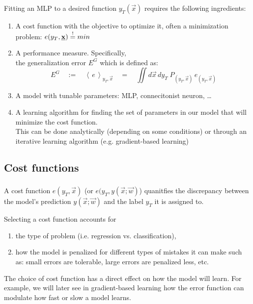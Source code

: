 \begin{frame}\frametitle{\subsecname}


Fitting an MLP to a desired function $y_T(\vec x)$ requires the following ingredients:

\begin{enumerate}
\item A cost function with the objective to optimize it, often a minimization problem: $e(y_T, \underline{\mathbf{x}}) \stackrel{\mathrm{!}}{=} min$
\item A performance measure. Specifically, \\

the generalization error $E^G$ which is defined as:	
\begin{equation} 
			E^G \quad := \quad \left<\,e\,\right>_{y_T, \vec{x}} 
			\quad = \quad \iint d \vec{x} \, dy_T \; 
				P_{(y_T, \vec{x})} \, e_{(y_T, \vec{x})}
\end{equation}

\item A model with tunable parameters: MLP, connecitonist neuron, \ldots
\item A learning algorithm for finding the set of parameters in our model that will minimize the cost function.\\
This can be done analytically (depending on some conditions) or through an iterative learning algorithm (e.g. gradient-based learning)
\end{enumerate}

\end{frame}

\subsection{Cost functions}
\begin{frame}\frametitle{\subsecname}

A cost function $e(y_T, \vec x)$ (or $e(y_T, y(\vec x; \vec w)$) quanitfies the discrepancy between the model's prediction $y(\vec x; \vec w)$ and the label $y_T$ it is assigned to.

Selecting a cost function accounts for 
\begin{enumerate}
\item the type of problem (i.e. regression vs. classification), 
\item how the model is penalized for different types of mistakes it can make such as:
small errors are tolerable, large errors are penalized less, etc.
\end{enumerate}

The choice of cost function has a direct effect on how the model will learn. For example, we will later see in gradient-based learning how the error function can modulate how fast or slow a model learns.

\end{frame}


